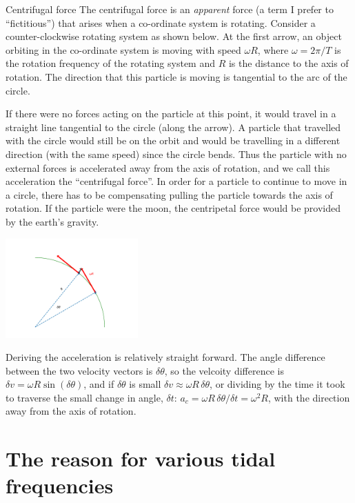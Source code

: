 \clearpage 
\clearpage 

\begin{derivbox}[label={box:volumeintegral}]{Centrifugal force}
  The centrifugal force is an \emph{apparent} force (a term I prefer to ``fictitious'') that arises when a co-ordinate system is rotating.  Consider a counter-clockwise rotating system as shown below.  At the first arrow, an object orbiting in the co-ordinate system is moving with speed $\omega R$, where $\omega = 2\pi/T$ is the rotation frequency of the rotating system and $R$ is the distance to the axis of rotation.  The direction that this particle is moving is tangential to the arc of the circle.  
  
If there were no forces acting on the particle at this point, it would travel in a straight line tangential to the circle (along the arrow).  A particle that travelled with the circle would still be on the orbit and would be travelling in a different direction (with the same speed) since the circle bends.  Thus the particle with no external forces is accelerated away from the axis of rotation, and we call this acceleration the ``centrifugal force''.  In order for a particle to continue to move in a circle, there has to be compensating  pulling the particle towards the axis of rotation.  If the particle were the moon, the centripetal force would be provided by the earth's gravity. 

  \includegraphics[width=2in]{figs/Waves/CentrifugalForce}
  
Deriving the acceleration  is relatively straight forward.  The angle difference between the two velocity vectors is $\delta \theta$, so the velcoity difference is $\delta v = \omega R \sin(\delta \theta)$, and if $\delta \theta$ is small $\delta v \approx \omega R\, \delta \theta$, or dividing by the time it took to traverse the small change in angle, $\delta t$: $a_c = \omega R \,\delta\theta/\delta t = \omega^2 R$, with the direction away from the axis of rotation.  
\end{derivbox}

\section{The reason for various tidal frequencies}

